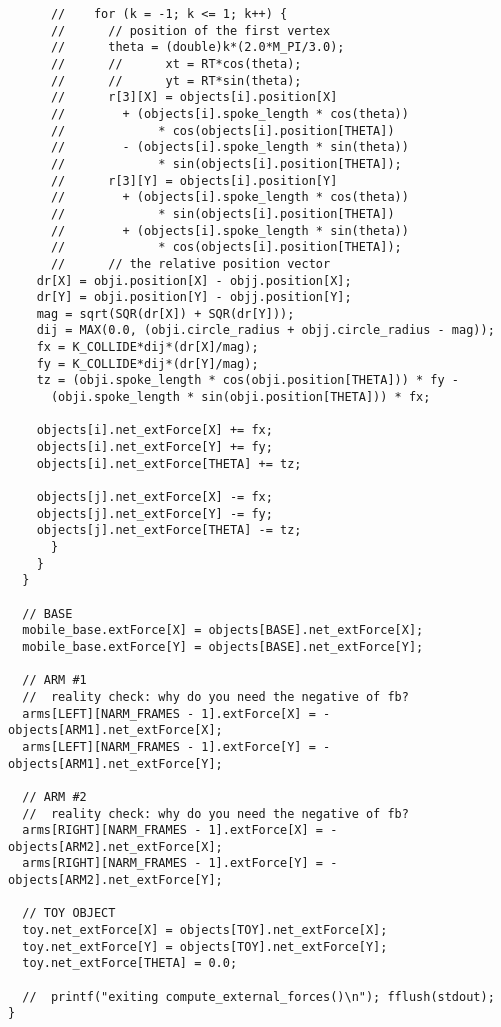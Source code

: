\documentclass{article}
\begin{document}
\begin{verbatim}
      //	for (k = -1; k <= 1; k++) {
      //	  // position of the first vertex
      //	  theta = (double)k*(2.0*M_PI/3.0);
      //	  //	  xt = RT*cos(theta); 
      //	  //	  yt = RT*sin(theta); 
      //	  r[3][X] = objects[i].position[X] 
      //	    + (objects[i].spoke_length * cos(theta))
      //	         * cos(objects[i].position[THETA]) 
      //	    - (objects[i].spoke_length * sin(theta))
      //	         * sin(objects[i].position[THETA]);
      //	  r[3][Y] = objects[i].position[Y] 
      //	    + (objects[i].spoke_length * cos(theta))
      //	         * sin(objects[i].position[THETA]) 
      //	    + (objects[i].spoke_length * sin(theta))
      //	         * cos(objects[i].position[THETA]);
      //	  // the relative position vector
	dr[X] = obji.position[X] - objj.position[X];
	dr[Y] = obji.position[Y] - objj.position[Y];
	mag = sqrt(SQR(dr[X]) + SQR(dr[Y]));
	dij = MAX(0.0, (obji.circle_radius + objj.circle_radius - mag)); 
	fx = K_COLLIDE*dij*(dr[X]/mag);
	fy = K_COLLIDE*dij*(dr[Y]/mag);
	tz = (obji.spoke_length * cos(obji.position[THETA])) * fy -
	  (obji.spoke_length * sin(obji.position[THETA])) * fx;

	objects[i].net_extForce[X] += fx;
	objects[i].net_extForce[Y] += fy;
	objects[i].net_extForce[THETA] += tz;

	objects[j].net_extForce[X] -= fx;
	objects[j].net_extForce[Y] -= fy;
	objects[j].net_extForce[THETA] -= tz;
      }
    }
  }

  // BASE
  mobile_base.extForce[X] = objects[BASE].net_extForce[X];
  mobile_base.extForce[Y] = objects[BASE].net_extForce[Y];

  // ARM #1
  //  reality check: why do you need the negative of fb?
  arms[LEFT][NARM_FRAMES - 1].extForce[X] = -objects[ARM1].net_extForce[X];
  arms[LEFT][NARM_FRAMES - 1].extForce[Y] = -objects[ARM1].net_extForce[Y];

  // ARM #2
  //  reality check: why do you need the negative of fb?
  arms[RIGHT][NARM_FRAMES - 1].extForce[X] = -objects[ARM2].net_extForce[X];
  arms[RIGHT][NARM_FRAMES - 1].extForce[Y] = -objects[ARM2].net_extForce[Y];

  // TOY OBJECT
  toy.net_extForce[X] = objects[TOY].net_extForce[X];
  toy.net_extForce[Y] = objects[TOY].net_extForce[Y];
  toy.net_extForce[THETA] = 0.0;

  //  printf("exiting compute_external_forces()\n"); fflush(stdout);
}

\end{verbatim}
\end{document}
